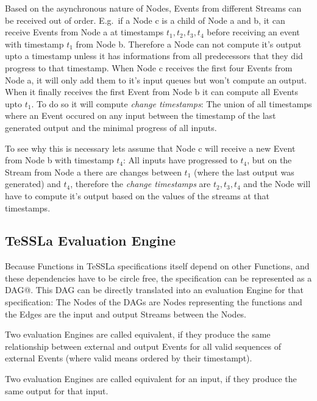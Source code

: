 Based on the asynchronous nature of Nodes, Events from different Streams can be received out of order.
E.g.\ if a Node c is a child of Node a and b, it can receive Events from Node a at timestamps \(t_1, t_2, t_3, t_4\)
before receiving an event with timestamp \(t_1\) from Node b.
Therefore a Node can not compute it's output upto a timestamp unless it has informations from all predecessors that they did progress to that timestamp.
When Node c receives the first four Events from Node a, it will only add them to it's input queues but won't compute an output.
When it finally receives the first Event from Node b it can compute all Events upto \(t_1\).
To do so it will compute \emph{change timestamps}: The union of all timestamps where an Event occured on any input between the timestamp of the last generated output and the minimal progress of all inputs.

To see why this is necessary lets assume that Node c will receive a new Event from Node b with timestamp \(t_4\):
All inputs have progressed to \(t_4\), but on the Stream from Node a there are changes between \(t_1\) (where the last output was generated) and \(t_4\),
therefore the \emph{change timestamps} are \(t_2, t_3, t_4\) and the Node will have to compute it's output based on the values of the streams at that timestamps.

\subsection{TeSSLa Evaluation Engine}
\label{sec:concepts:def:eval_engine}

Because Functions in TeSSLa specifications itself depend on other Functions, and these dependencies have to be circle free,
the specification can be represented as a DAG@.
This DAG can be directly translated into an evaluation Engine for that specification: The Nodes of the DAGs are Nodes representing the functions and the Edges are the input and output Streams between the Nodes.


\begin{definition}[name=Equivalence of evaluation Engines]\label{def:equivalence_eval_engine}
  Two evaluation Engines are called equivalent, if they produce the same relationship between external and output Events for all valid sequences of external Events (where valid means ordered by their timestampt).
\end{definition}

\begin{definition}[name=Equivalence of evaluation Engines for an input]\label{def:equivalence_eval_engine_specific}
  Two evaluation Engines are called equivalent for an input, if they produce the same output for that input.
\end{definition}

